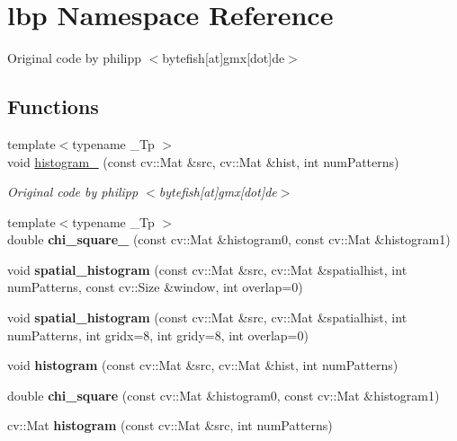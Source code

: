 \section{lbp Namespace Reference}
\label{namespacelbp}


Original code by philipp $<$bytefish\mbox{[}at\mbox{]}gmx\mbox{[}dot\mbox{]}de$>$  


\subsection*{Functions}
\begin{DoxyCompactItemize}
\item 
{\footnotesize template$<$typename \+\_\+\+Tp $>$ }\\void \hyperlink{namespacelbp_a7a2d45fdc785282bc110d25495ef78d7}{histogram\+\_\+} (const cv\+::\+Mat \&src, cv\+::\+Mat \&hist, int num\+Patterns)
\begin{DoxyCompactList}\small\item\em Original code by philipp $<$bytefish\mbox{[}at\mbox{]}gmx\mbox{[}dot\mbox{]}de$>$ \end{DoxyCompactList}\item 
\mbox{\label{namespacelbp_a7f6233ae8ce09653d048465413e5a40f}} 
{\footnotesize template$<$typename \+\_\+\+Tp $>$ }\\double {\bfseries chi\+\_\+square\+\_\+} (const cv\+::\+Mat \&histogram0, const cv\+::\+Mat \&histogram1)
\item 
\mbox{\label{namespacelbp_a033b381259dbac1e636bf1729abd0d84}} 
void {\bfseries spatial\+\_\+histogram} (const cv\+::\+Mat \&src, cv\+::\+Mat \&spatialhist, int num\+Patterns, const cv\+::\+Size \&window, int overlap=0)
\item 
\mbox{\label{namespacelbp_afe088914321c9c6210cdb611aa6c2fa9}} 
void {\bfseries spatial\+\_\+histogram} (const cv\+::\+Mat \&src, cv\+::\+Mat \&spatialhist, int num\+Patterns, int gridx=8, int gridy=8, int overlap=0)
\item 
\mbox{\label{namespacelbp_a1ec08379651e945f526ee485960feb55}} 
void {\bfseries histogram} (const cv\+::\+Mat \&src, cv\+::\+Mat \&hist, int num\+Patterns)
\item 
\mbox{\label{namespacelbp_abc2c2aedd18a2a6edd9c128c843bb572}} 
double {\bfseries chi\+\_\+square} (const cv\+::\+Mat \&histogram0, const cv\+::\+Mat \&histogram1)
\item 
\mbox{\label{namespacelbp_ab84f853b680a693ba42f63e32cdbb7b6}} 
cv\+::\+Mat {\bfseries histogram} (const cv\+::\+Mat \&src, int num\+Patterns)

\end{DoxyCompactItemize}
